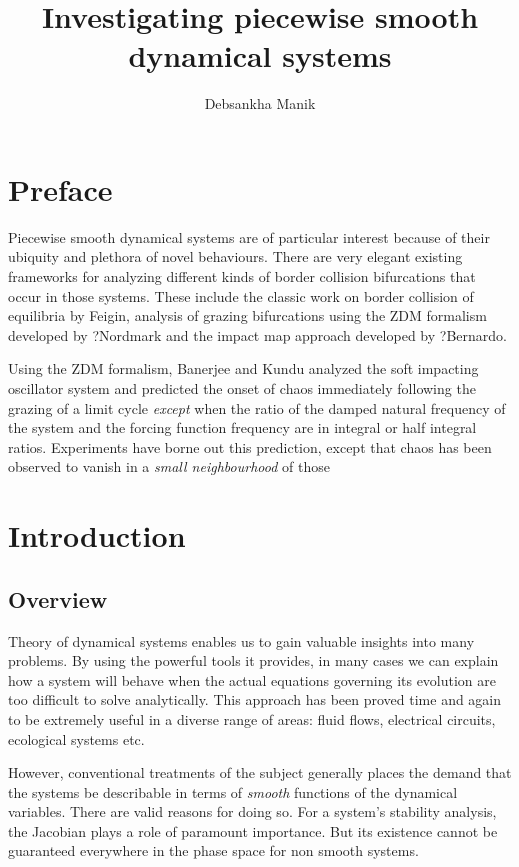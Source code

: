 \documentclass{book}
\renewcommand{\(}{\begin{columns}}
\renewcommand{\)}{\end{columns}}
\newcommand{\<}[1]{\begin{column}{#1}}
\renewcommand{\>}{\end{column}}
\begin{document}
\title{Investigating piecewise smooth dynamical systems}
\author{Debsankha Manik}
\maketitle

\frontmatter
\chapter{Preface}
Piecewise smooth dynamical systems are of particular interest because of their 
ubiquity and plethora of novel behaviours.  There are very elegant existing frameworks
for analyzing different kinds of border collision bifurcations that occur in those systems.
These include the classic work on border collision of equilibria by Feigin, analysis of grazing 
bifurcations using the ZDM formalism developed by ?Nordmark and the impact map 
approach developed by ?Bernardo.  

Using the ZDM formalism, Banerjee and Kundu analyzed the soft impacting oscillator system
and predicted the onset of chaos immediately following the grazing of a limit 
cycle \emph{except} when the ratio of the damped natural frequency of the 
system and the forcing function frequency are in integral or half integral 
ratios.  Experiments have borne out this prediction, except that chaos has 
been observed to vanish in a \emph{small neighbourhood} of those 


\tableofcontents

\mainmatter
\chapter{Introduction}
\section{Overview}
Theory of dynamical systems enables us to gain valuable insights into many problems.  By using the powerful 
tools it provides, in many cases we can explain how a system will behave 
when the actual equations governing its evolution are too difficult to solve 
analytically.  This approach has been proved time and again to be extremely 
useful in a diverse range of areas: fluid flows, electrical circuits, 
ecological systems etc.  

However, conventional treatments of the subject generally places the demand 
that the systems be describable in terms of \emph{smooth} functions of the 
dynamical variables. There are valid reasons for doing so.  For a system's 
stability analysis, the Jacobian plays a role of paramount importance.  But 
its existence cannot be guaranteed everywhere in the phase space for non 
smooth systems.  
\end{document}
